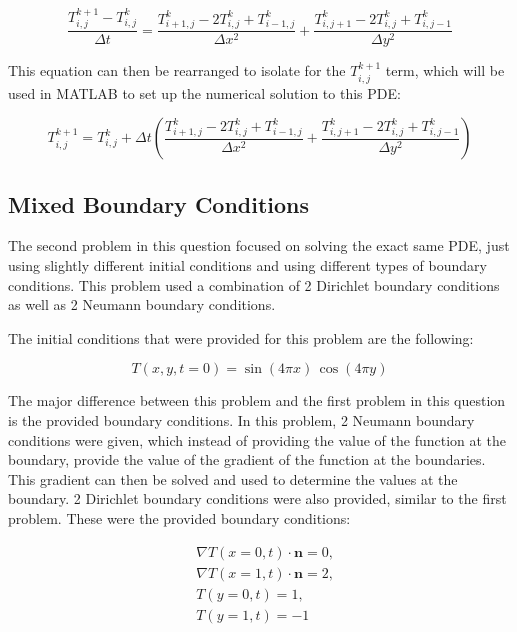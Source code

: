 \documentclass[12pt]{article}
\begin{document}
\begin{equation}
    \label{eqn:q3_discretizing}
    \frac{T_{i,j}^{k+1} - T_{i,j}^k}{\Delta t} = \frac{T_{i+1,j}^k - 2T_{i,j}^k + T_{i-1,j}^k}{\Delta x^2} + \frac{T_{i,j+1}^k - 2T_{i,j}^k + T_{i,j-1}^k}{\Delta y^2}
\end{equation}

\noindent This equation can then be rearranged to isolate for the $T_{i,j}^{k+1}$ term, which will be used in MATLAB to set up the numerical solution to this PDE:

\begin{equation}
    \label{eqn:q3_discretizing_2}
    T_{i,j}^{k+1} = T_{i,j}^k + \Delta t \left( \frac{T_{i+1,j}^k - 2T_{i,j}^k + T_{i-1,j}^k}{\Delta x^2} + \frac{T_{i,j+1}^k - 2T_{i,j}^k + T_{i,j-1}^k}{\Delta y^2} \right)
\end{equation}

\subsection{Mixed Boundary Conditions}

The second problem in this question focused on solving the exact same PDE, just using slightly different initial conditions and using different types of boundary conditions. This problem used a combination of 2 Dirichlet boundary conditions as well as 2 Neumann boundary conditions. 

\noindent The initial conditions that were provided for this problem are the following:

\begin{equation}
        \label{eqn:q3_Neumann_IC}
        T(x,y,t=0) = \sin(4\pi x) \, \cos(4\pi y)
\end{equation}

The major difference between this problem and the first problem in this question is the provided boundary conditions. In this problem, 2 Neumann boundary conditions were given, which instead of providing the value of the function at the boundary, provide the value of the gradient of the function at the boundaries. 
This gradient can then be solved and used to determine the values at the boundary. 2 Dirichlet boundary conditions were also provided, similar to the first problem. These were the provided boundary conditions:

\begin{equation}
    \label{eqn:q3_Neumann_BC}
    \begin{aligned}
        & \nabla T(x = 0, t) \cdot \mathbf{n} = 0, \\
        & \nabla T(x = 1, t) \cdot \mathbf{n} = 2, \\
        & T(y = 0, t) = 1, \\
        & T(y = 1, t) = -1
    \end{aligned}
\end{equation}
\end{document}
